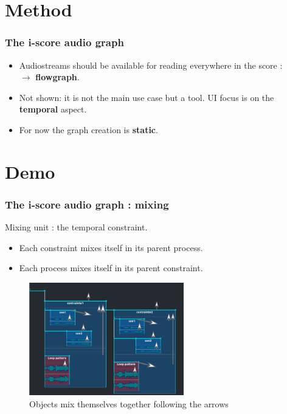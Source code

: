 \documentclass[draft]{beamer}
\begin{document}
\section{Method}
\begin{frame}
    \frametitle{The i-score audio graph}    
    \Large
    \begin{itemize}
        \item Audiostreams should be available for reading everywhere in the score : \\ $\rightarrow$ \textbf{flowgraph}.
        \item Not shown: it is not the main use case but a tool. UI focus is on the \textbf{temporal} aspect.
        \item For now the graph creation is \textbf{static}.
    \end{itemize}    
\end{frame}
\section{Demo}

\begin{frame}
    \frametitle{The i-score audio graph : mixing}    
	\Large
	
    Mixing unit : the temporal constraint.
    
    \begin{itemize}
        \item Each constraint mixes itself in its parent process.
        \item Each process mixes itself in its parent constraint.
    \end{itemize}
    
	\begin{figure}
		\centering
		\includegraphics[width=0.6\textwidth]{images/mixage.png}
		\caption{Objects mix themselves together following the arrows}
	\end{figure}
\end{frame}
\end{document}
